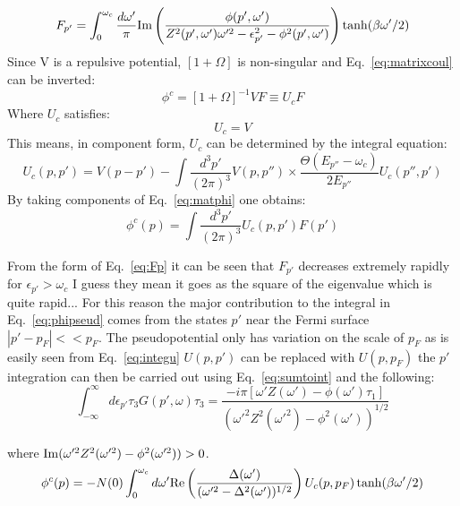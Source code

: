 \documentclass{article}
\begin{document}
\begin{equation}
\label{eq:Fp}
F_{p'}= \int_{0}^{\omega_{c}}\frac{d\omega'}{\pi}{\rm Im}\left(\frac{\phi(p',\omega')}{Z^{2}(p',\omega')\omega'^{2}
-\epsilon^{2}_{p'} -\phi^{2}(p',\omega') }\right)\tanh(\beta\omega'/2)
\end{equation}
%
Since V is a repulsive potential, $[1+\Omega]$ is non-singular and Eq.~\ref{eq:matrixcoul}
can be inverted:
\begin{equation}
\label{eq:matphi}
\phi^{c} = [1+\Omega]^{-1}VF \equiv U_{c}F
\end{equation}
%
Where $U_{c}$ satisfies:
%
\begin{equation}
[1+\Omega]U_{c} = V
\end{equation}
%
This means, in component form, $U_c$ can be determined by the integral equation:
%
\begin{equation}
\label{eq:integu}
U_{c}(p,p') = V(p-p') - \int \frac{d^{3}p'}{(2\pi)^{3}}V(p,p'')\times
\frac{\Theta(E_{p''}-\omega_{c})}{2E_{p''}}U_{c}(p'',p')
\end{equation}
%
By taking components of Eq.~\ref{eq:matphi} one obtains:
%
\begin{equation}
\label{eq:phipseud}
\phi^{c}(p) = \int \frac{d^{3}p'}{(2\pi)^{3}}U_{c}(p,p')F(p')
\end{equation}
%

From the form of Eq.~\ref{eq:Fp} it can be seen that $F_{p'}$ decreases extremely rapidly
for $\epsilon_{p'} > \omega_{c}$ I guess they mean it goes as the square of 
the eigenvalue which is quite rapid... For this reason
the major contribution to the integral in Eq.~\ref{eq:phipseud} comes from the states
$p'$ near the Fermi surface  $|p'-p_{F}|<<p_{F}$. The pseudopotential only has
variation on the scale of $p_{F}$ as is easily seen from Eq.~\ref{eq:integu} 
$U(p,p')$ can be replaced with $U(p,p_{F})$ the $p'$ integration can 
then be carried out using Eq.~\ref{eq:sumtoint} and the following:
%
\begin{equation}
\int_{-\infty}^{\infty}d\epsilon_{p'} \tau_{3}G(p',\omega)\tau_{3} =
\frac{-i\pi[\omega'Z(\omega') - \phi(\omega')\tau_{1}]}{(\omega'^{2}Z^{2}(\omega'^{2})-\phi^{2}(\omega'))^{1/2}}
\end{equation}

where ${\rm Im}(\omega'^{2}Z^{2}(\omega'^2) -\phi^{2}(\omega'^{2})) > 0$.
\begin{equation}
\phi^{c}(p) = -N(0) \int_{0}^{\omega_{c}} d\omega' {\rm Re}\left(\frac{\Delta(\omega')}{(\omega'^{2}-\Delta^{2}(\omega'))^{1/2}}\right)U_{c}(p,p_{F})\tanh(\beta \omega'/2)
\end{equation}
\end{document}

